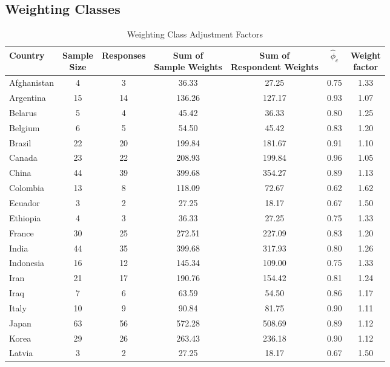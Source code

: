 \documentclass{article}
\theoremstyle{definition}
\begin{document}
\subsection{Weighting Classes} \label{sec:weights}
\begin{table}[H]
\centering
\caption{Weighting Class Adjustment Factors}
\begin{tabular}{l|cccccc}
Country & \shortstack{Sample \\ Size} & Responses & \shortstack{Sum of \\ Sample Weights} & \shortstack{Sum of \\ Respondent Weights} & $\hat{\phi}_c$ & \shortstack{Weight \\ factor} \\
  \hline
Afghanistan &   4 &   3 & 36.33 & 27.25 & 0.75 & 1.33 \\
Argentina &  15 &  14 & 136.26 & 127.17 & 0.93 & 1.07 \\
Belarus &   5 &   4 & 45.42 & 36.33 & 0.80 & 1.25 \\
Belgium &   6 &   5 & 54.50 & 45.42 & 0.83 & 1.20 \\
Brazil &  22 &  20 & 199.84 & 181.67 & 0.91 & 1.10 \\
Canada &  23 &  22 & 208.93 & 199.84 & 0.96 & 1.05 \\
China &  44 &  39 & 399.68 & 354.27 & 0.89 & 1.13 \\
Colombia &  13 &   8 & 118.09 & 72.67 & 0.62 & 1.62 \\
Ecuador &   3 &   2 & 27.25 & 18.17 & 0.67 & 1.50 \\
Ethiopia &   4 &   3 & 36.33 & 27.25 & 0.75 & 1.33 \\
France &  30 &  25 & 272.51 & 227.09 & 0.83 & 1.20 \\
India &  44 &  35 & 399.68 & 317.93 & 0.80 & 1.26 \\
Indonesia &  16 &  12 & 145.34 & 109.00 & 0.75 & 1.33 \\
Iran &  21 &  17 & 190.76 & 154.42 & 0.81 & 1.24 \\
Iraq &   7 &   6 & 63.59 & 54.50 & 0.86 & 1.17 \\
Italy &  10 &   9 & 90.84 & 81.75 & 0.90 & 1.11 \\
Japan &  63 &  56 & 572.28 & 508.69 & 0.89 & 1.12 \\
Korea  &  29 &  26 & 263.43 & 236.18 & 0.90 & 1.12 \\
Latvia &   3 &   2 & 27.25 & 18.17 & 0.67 & 1.50 \\

\end{tabular}
\end{table}
\end{document}
